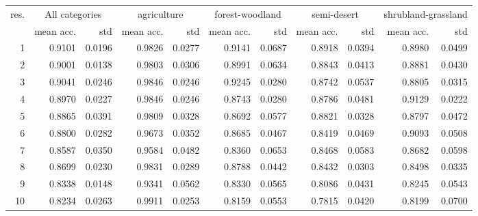 \begin{tabular}{rrrrrrrrrrr}
\toprule
res. & \multicolumn{2}{c}{All categories} & \multicolumn{2}{c}{agriculture} & \multicolumn{2}{c}{forest-woodland} & \multicolumn{2}{c}{semi-desert} & \multicolumn{2}{c}{shrubland-grassland} \\
           &     mean acc. &    std &                 mean acc. &    std &                     mean acc. &    std &                 mean acc. &    std &                         mean acc. &    std \\
\midrule
         1 &   0.9101 & 0.0196 &               0.9826 & 0.0277 &                   0.9141 & 0.0687 &               0.8918 & 0.0394 &                       0.8980 & 0.0499 \\
         2 &   0.9001 & 0.0138 &               0.9803 & 0.0306 &                   0.8991 & 0.0634 &               0.8843 & 0.0413 &                       0.8881 & 0.0430 \\
         3 &   0.9041 & 0.0246 &               0.9846 & 0.0246 &                   0.9245 & 0.0280 &               0.8742 & 0.0537 &                       0.8805 & 0.0315 \\
         4 &   0.8970 & 0.0227 &               0.9846 & 0.0246 &                   0.8743 & 0.0280 &               0.8786 & 0.0481 &                       0.9129 & 0.0222 \\
         5 &   0.8865 & 0.0391 &               0.9809 & 0.0328 &                   0.8692 & 0.0577 &               0.8821 & 0.0328 &                       0.8797 & 0.0472 \\
         6 &   0.8800 & 0.0282 &               0.9673 & 0.0352 &                   0.8685 & 0.0467 &               0.8419 & 0.0469 &                       0.9093 & 0.0508 \\
         7 &   0.8587 & 0.0350 &               0.9584 & 0.0482 &                   0.8360 & 0.0653 &               0.8468 & 0.0583 &                       0.8682 & 0.0598 \\
         8 &   0.8699 & 0.0230 &               0.9831 & 0.0289 &                   0.8788 & 0.0442 &               0.8432 & 0.0303 &                       0.8498 & 0.0335 \\
         9 &   0.8338 & 0.0148 &               0.9341 & 0.0562 &                   0.8330 & 0.0565 &               0.8086 & 0.0431 &                       0.8245 & 0.0543 \\
        10 &   0.8234 & 0.0263 &               0.9911 & 0.0253 &                   0.8159 & 0.0553 &               0.7815 & 0.0420 &                       0.8199 & 0.0700 \\

\end{tabular}

